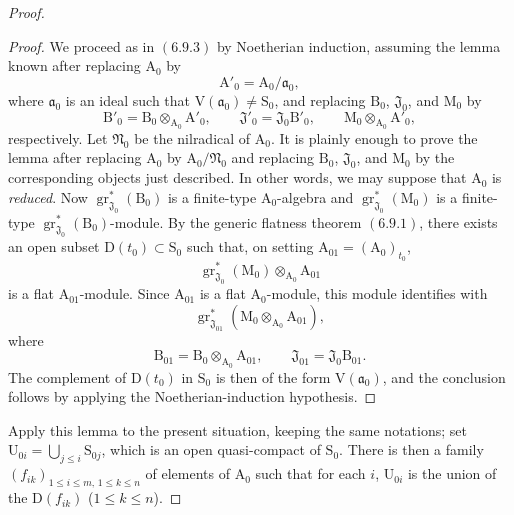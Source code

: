 \begin{proof}
\begin{proof}
We proceed as in $(6.9.3)$ by Noetherian induction, assuming the lemma known after replacing $\mathrm{A}_0$ by
\[
  \mathrm{A}'_0=\mathrm{A}_0/\mathfrak{a}_0,
\]
where $\mathfrak{a}_0$ is an ideal such that $\mathrm{V}(\mathfrak{a}_0)\neq\mathrm{S}_0$, and replacing $\mathrm{B}_0$, $\mathfrak{J}_0$, and $\mathrm{M}_0$ by
\[
  \mathrm{B}'_0=\mathrm{B}_0\otimes_{\mathrm{A}_0}\mathrm{A}'_0,
  \qquad
  \mathfrak{J}'_0=\mathfrak{J}_0\mathrm{B}'_0,
  \qquad
  \mathrm{M}_0\otimes_{\mathrm{A}_0}\mathrm{A}'_0,
\]
respectively. Let $\mathfrak{N}_0$ be the nilradical of $\mathrm{A}_0$. It
is plainly enough to prove the lemma after replacing $\mathrm{A}_0$ by
$\mathrm{A}_0/\mathfrak{N}_0$ and replacing $\mathrm{B}_0$,
$\mathfrak{J}_0$, and $\mathrm{M}_0$ by the corresponding objects just
described. In other words, we may suppose that $\mathrm{A}_0$ is
\emph{reduced}. Now
$\operatorname{gr}^*_{\mathfrak{J}_0}(\mathrm{B}_0)$ is a finite-type
$\mathrm{A}_0$-algebra and
$\operatorname{gr}^*_{\mathfrak{J}_0}(\mathrm{M}_0)$ is a finite-type
$\operatorname{gr}^*_{\mathfrak{J}_0}(\mathrm{B}_0)$-module. By the generic
flatness theorem $(6.9.1)$, there exists an open subset
$\mathrm{D}(t_0)\subset\mathrm{S}_0$ such that, on setting
$\mathrm{A}_{01}=(\mathrm{A}_0)_{t_0}$,
\[
  \operatorname{gr}^*_{\mathfrak{J}_0}(\mathrm{M}_0)
  \otimes_{\mathrm{A}_0}\mathrm{A}_{01}
\]
is a flat $\mathrm{A}_{01}$-module. Since $\mathrm{A}_{01}$ is a flat $\mathrm{A}_0$-module, this module identifies with
\[
  \operatorname{gr}^*_{\mathfrak{J}_{01}}
  (\mathrm{M}_0\otimes_{\mathrm{A}_0}\mathrm{A}_{01}),
\]
where
\[
  \mathrm{B}_{01}=\mathrm{B}_0\otimes_{\mathrm{A}_0}\mathrm{A}_{01},
  \qquad
  \mathfrak{J}_{01}=\mathfrak{J}_0\mathrm{B}_{01}.
\]
The complement of $\mathrm{D}(t_0)$ in $\mathrm{S}_0$ is then of the form $\mathrm{V}(\mathfrak{a}_0)$, and the conclusion follows by applying the Noetherian-induction hypothesis.
\end{proof}

Apply this lemma to the present situation, keeping the same notations; set $\mathrm{U}_{0i}=\bigcup_{j\leqslant i}\mathrm{S}_{0j}$, which is an open quasi-compact of $\mathrm{S}_0$. There is then a family $(f_{ik})_{1\leqslant i\leqslant m,\,1\leqslant k\leqslant n}$ of elements of $\mathrm{A}_0$ such that for each $i$, $\mathrm{U}_{0i}$ is the union of the $\mathrm{D}(f_{ik})$ ($1\leqslant k\leqslant n$).



\end{proof}
